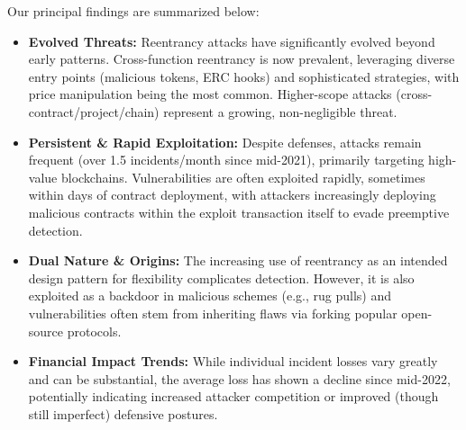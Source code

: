Our principal findings are summarized below:
\begin{itemize}
    \item \textbf{Evolved Threats:} Reentrancy attacks have significantly evolved beyond early patterns. Cross-function reentrancy is now prevalent, leveraging diverse entry points (\eg malicious tokens, ERC hooks) and sophisticated strategies, with price manipulation being the most common. Higher-scope attacks (cross-contract/project/chain) represent a growing, non-negligible threat.
    \item \textbf{Persistent \& Rapid Exploitation:} Despite defenses, attacks remain frequent (over 1.5 incidents/month since mid-2021), primarily targeting high-value blockchains. Vulnerabilities are often exploited rapidly, sometimes within days of contract deployment, with attackers increasingly deploying malicious contracts within the exploit transaction itself to evade preemptive detection.
    \item \textbf{Dual Nature \& Origins:} The increasing use of reentrancy as an intended design pattern for flexibility complicates detection. However, it is also exploited as a backdoor in malicious schemes (e.g., rug pulls) and vulnerabilities often stem from inheriting flaws via forking popular open-source protocols.
    \item \textbf{Financial Impact Trends:} While individual incident losses vary greatly and can be substantial, the average loss has shown a decline since mid-2022, potentially indicating increased attacker competition or improved (though still imperfect) defensive postures.
\end{itemize}
